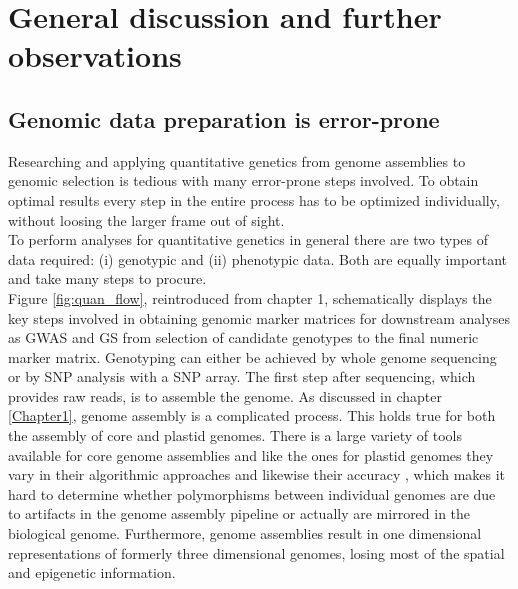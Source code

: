 \chapter{General discussion and further observations} %
\label{Chapter6}
\section{Genomic data preparation is error-prone}

Researching and applying quantitative genetics from genome assemblies to genomic selection
is tedious with many error-prone steps involved. To obtain optimal results every step in
the entire process has to be optimized individually, without loosing the larger frame out
of sight. \\
To perform analyses for quantitative genetics in general there are two types of data
required: (i) genotypic and (ii) phenotypic data. Both are equally important and take many
steps to procure. \\
Figure \ref{fig:quan_flow}, reintroduced from chapter 1, schematically displays the key
steps involved in obtaining genomic marker matrices for downstream analyses as GWAS and GS
from selection of candidate genotypes to the final numeric marker matrix. Genotyping can
either be achieved by whole genome sequencing or by SNP analysis with a SNP array.  The
first step after sequencing, which provides raw reads, is to assemble the genome. As
discussed in chapter \ref{Chapter1}, genome assembly is a complicated process. This holds
true for both the assembly of core and plastid genomes. There is a large variety of tools
available for core genome assemblies and like the ones for plastid genomes they vary in
their algorithmic approaches and likewise their accuracy \cite{zhang2011practical}, which
makes it hard to determine whether polymorphisms between individual genomes are due to
artifacts in the genome assembly pipeline or actually are mirrored in the biological
genome. Furthermore, genome assemblies result in one dimensional representations of
formerly three dimensional genomes, losing most of the spatial and epigenetic information.

